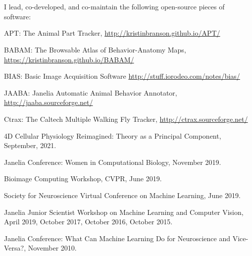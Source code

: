 \documentclass[11pt, letterpaper]{awesome-cv}
\begin{document}
\vspace{\acvSectionContentTopSkip}
\vspace{2mm}
\\
\vspace{\acvSectionContentTopSkip}


\vspace{\acvSectionContentTopSkip}
\vspace{2mm}

\vspace{\acvSectionContentTopSkip}

\vspace{\acvSectionContentTopSkip}\\
I lead, co-developed, and co-maintain the following open-source pieces of software:\\
\begin{cvitems}
\item APT: The Animal Part Tracker, \url{http://kristinbranson.github.io/APT/}
  \item BABAM: The Browsable Atlas of Behavior-Anatomy Maps, \url{https://kristinbranson.github.io/BABAM/}
\item BIAS: Basic Image Acquisition Software \url{http://stuff.iorodeo.com/notes/bias/}
\item JAABA: Janelia Automatic Animal Behavior Annotator, \url{http://jaaba.sourceforge.net/}
\item Ctrax: The Caltech Multiple Walking Fly Tracker, \url{http://ctrax.sourceforge.net/}
\end{cvitems}
\vspace{\acvSectionContentTopSkip}

\vspace{\acvSectionContentTopSkip}
\vspace{2mm}
\begin{cvitems}
\item 4D Cellular Physiology Reimagined: Theory as a Principal Component, September, 2021. 
\item Janelia Conference: Women in Computational Biology, November 2019.
\item Bioimage Computing Workshop, CVPR, June 2019.
\item Society for Neuroscience Virtual Conference on Machine Learning, June 2019.
\item Janelia Junior Scientist Workshop on Machine Learning and Computer Vision, April 2019, October 2017, October 2016, October 2015.
\item Janelia Conference: What Can Machine Learning Do for Neuroscience and Vice-Versa?, November 2010.
\end{cvitems}
\vspace{\acvSectionContentTopSkip}
\end{document}
